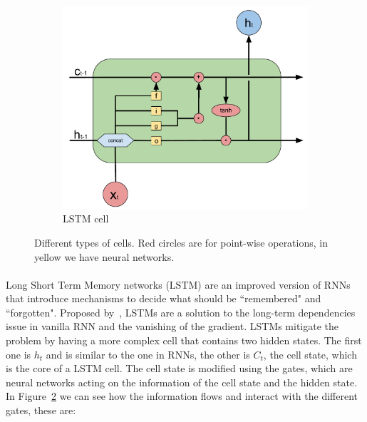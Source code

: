 \begin{figure}[]
\begin{subfigure}[t]{0.5\textwidth}
    \end{subfigure}%
    ~ 
    \begin{subfigure}[t]{0.5\textwidth}
        \centering
        \includegraphics[width=\textwidth]{images/LSTM_cell_simple.pdf}
        \caption{LSTM cell}
        \label{subfig:lstm_cell}

    \end{subfigure}
    \caption{Different types of cells. Red circles are for point-wise operations, in yellow we have neural networks.} %
    \label{fig:cells}
\end{figure} 

\paragraph{}
Long Short Term Memory networks (LSTM) are an improved version of RNNs  that introduce mechanisms to decide what should be ``remembered" and ``forgotten". Proposed by~\cite{hochreiter1997long}, LSTMs are a solution to the long-term dependencies issue in vanilla RNN and the vanishing of the gradient. LSTMs mitigate the problem by having a more complex cell that contains two hidden states. The first one is $h_t$ and is similar to the one in RNNs, the other is $C_t$, the cell state, which is the core of a LSTM cell. The cell state is modified using the gates, which are neural networks acting on the information of the cell state and the hidden state. In Figure~\ref{fig:cells} we can see how the information flows and interact with the different gates, these are:

